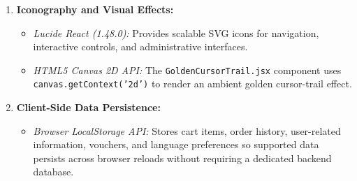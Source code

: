 \documentclass[12pt,a4paper,oneside]{report}
\begin{document}
\begin{enumerate}[leftmargin=1.2cm]
\begin{itemize}[nosep]
        \item \textit{Google Fonts:} Playfair Display and Cormorant Garamond for editorial serif headings, together with Montserrat for body text and interface content.
    \end{itemize}
    \item \textbf{Iconography and Visual Effects:}
    \begin{itemize}[nosep]
        \item \textit{Lucide React (1.48.0):} Provides scalable SVG icons for navigation, interactive controls, and administrative interfaces.
        \item \textit{HTML5 Canvas 2D API:} The \texttt{GoldenCursorTrail.jsx} component uses \texttt{canvas.getContext('2d')} to render an ambient golden cursor-trail effect.
    \end{itemize}
    \item \textbf{Client-Side Data Persistence:}
    \begin{itemize}[nosep]
        \item \textit{Browser LocalStorage API:} Stores cart items, order history, user-related information, vouchers, and language preferences so supported data persists across browser reloads without requiring a dedicated backend database.
    \end{itemize}
\end{enumerate}
\end{document}

